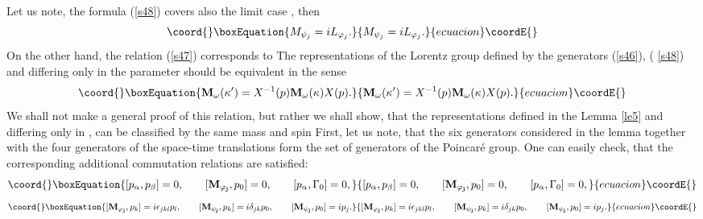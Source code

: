\documentclass[a4paper,a4paper]{article}
\begin{document}
Let us note, the formula (\ref{s48}) covers also the limit case \myHighlight{$\left|
\kappa \right| \rightarrow \infty $}\coordHE{}, then 
\begin{equation}\coord{}\boxEquation{
M_{\psi _{j}}=iL_{\varphi _{j}}.  \label{s49}
}{
M_{\psi _{j}}=iL_{\varphi _{j}}.  }{ecuacion}\coordE{}\end{equation}%
On the other hand, the relation (\ref{s47}) corresponds to \coordHE{} The
representations of the Lorentz group defined by the generators (\ref{s46}), (%
\ref{s48}) and differing only in the parameter \myHighlight{$\kappa $}\coordHE{} should be
equivalent in the sense 
\begin{equation}\coord{}\boxEquation{
\mathbf{M}_{\omega }(\kappa ^{\prime })=X^{-1}(p)\mathbf{M}_{\omega }(\kappa
)X(p).  \label{sa49}
}{
\mathbf{M}_{\omega }(\kappa ^{\prime })=X^{-1}(p)\mathbf{M}_{\omega }(\kappa
)X(p).  }{ecuacion}\coordE{}\end{equation}%
We shall not make a general proof of this relation, but rather we shall
show, that the representations defined in the Lemma \ref{le5} and differing
only in \myHighlight{$\kappa $}\coordHE{}, can be classified by the same mass \coordHE{} and spin 
\coordHE{} First, let us note, that the six generators
considered in the lemma together with the four generators \coordHE{} of
the space-time translations form the set of generators of the Poincar\'{e}
group. One can easily check, that the corresponding additional commutation
relations are satisfied: 
\begin{equation}\coord{}\boxEquation{
\lbrack p_{\alpha },p_{\beta }]=0,\qquad \lbrack \mathbf{M_{\varphi _{j}}}
,p_{0}]=0,\qquad \lbrack p_{\alpha },\Gamma _{0}]=0,  \label{sa50}
}{
\lbrack p_{\alpha },p_{\beta }]=0,\qquad \lbrack \mathbf{M_{\varphi _{j}}}
,p_{0}]=0,\qquad \lbrack p_{\alpha },\Gamma _{0}]=0,  }{ecuacion}\coordE{}\end{equation}%
\begin{equation}\coord{}\boxEquation{
\lbrack \mathbf{M_{\varphi _{j}}},p_{k}]=i\epsilon _{jkl}p_{l},\qquad
\lbrack \mathbf{M_{\psi _{j}}},p_{k}]=i\delta _{jk}p_{0},\qquad \lbrack 
\mathbf{M_{\psi _{j}}},p_{0}]=ip_{j}.  \label{sb50}
}{
\lbrack \mathbf{M_{\varphi _{j}}},p_{k}]=i\epsilon _{jkl}p_{l},\qquad
\lbrack \mathbf{M_{\psi _{j}}},p_{k}]=i\delta _{jk}p_{0},\qquad \lbrack 
\mathbf{M_{\psi _{j}}},p_{0}]=ip_{j}.  }{ecuacion}\coordE{}\end{equation}%
\end{document}
